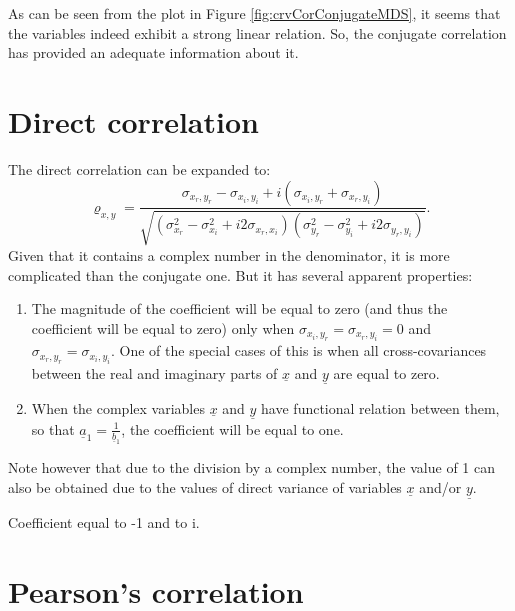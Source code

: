 \documentclass[
]{book}
\begin{document}
As can be seen from the plot in Figure \ref{fig:crvCorConjugateMDS}, it seems that the variables indeed exhibit a strong linear relation. So, the conjugate correlation has provided an adequate information about it.

\hypertarget{correlationDirect}{%
\section{Direct correlation}\label{correlationDirect}}

The direct correlation can be expanded to:
\begin{equation}
    {\varrho}_{x,y} = \frac{\sigma_{x_r, y_r} - \sigma_{x_i, y_i} + i (\sigma_{x_i, y_r} + \sigma_{x_r, y_i})}{\sqrt{(\sigma_{x_r}^2 - \sigma_{x_i}^2 + i2 \sigma_{x_r,x_i})(\sigma_{y_r}^2 - \sigma_{y_i}^2 + i2 \sigma_{y_r,y_i})}}.
    \label{eq:correlationPseudoExpanded}
\end{equation}
Given that it contains a complex number in the denominator, it is more complicated than the conjugate one. But it has several apparent properties:

\begin{enumerate}
\def\labelenumi{\arabic{enumi}.}
\item
  The magnitude of the coefficient will be equal to zero (and thus the coefficient will be equal to zero) only when \(\sigma_{x_i,y_r}=\sigma_{x_r,y_i}=0\) and \(\sigma_{x_r,y_r}=\sigma_{x_i,y_i}\). One of the special cases of this is when all cross-covariances between the real and imaginary parts of \(\underline{x}\) and \(\underline{y}\) are equal to zero.
\item
  When the complex variables \(\underline{x}\) and \(\underline{y}\) have functional relation between them, so that \(\underline{a}_1 = \frac{1}{\underline{b}_1}\), the coefficient will be equal to one.
\end{enumerate}

Note however that due to the division by a complex number, the value of 1 can also be obtained due to the values of direct variance of variables \(\underline{x}\) and/or \(\underline{y}\).

Coefficient equal to -1 and to i.

\hypertarget{correlationMDSPearson}{%
\section{Pearson's correlation}\label{correlationMDSPearson}}
\end{document}
